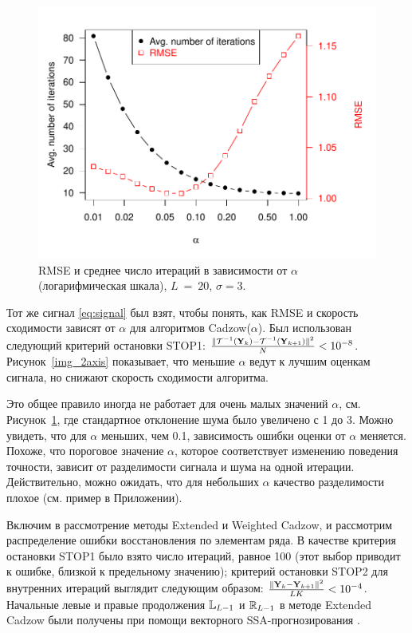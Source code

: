 \documentclass[12pt, specialist, subf,href,colorlinks=true,substylefile = spbu.rtx]{disser}
\theoremstyle{remark}
\theoremstyle{definition}
\begin{document}
\begin{figure}[!hhh]
	\begin{center}
	\includegraphics[width = 0.75\columnwidth]{2axis-3.pdf}
	\caption{RMSE и среднее число итераций в зависимости от $\alpha$ (логарифмическая шкала), $L~=~20$, $\sigma=3$.}
	\label{img_2axis-3}
	\end{center}
\end{figure}

Тот же сигнал \eqref{eq:signal} был взят, чтобы понять, как RMSE и скорость сходимости зависят от $\alpha$ для алгоритмов Cadzow($\alpha$). Был использован следующий критерий остановки STOP1: $\frac{\|\mathcal{T}^{-1}(\mathbf{Y}_k) - \mathcal{T}^{-1}(\mathbf{Y}_{k + 1})\|^2}{N} < 10^{-8}$. Рисунок~\ref{img_2axis} показывает, что меньшие $\alpha$ ведут к лучшим оценкам сигнала, но снижают скорость сходимости алгоритма.

Это общее правило иногда не работает для очень малых значений $\alpha$, см. Рисунок~\ref{img_2axis-3}, где стандартное отклонение шума было увеличено с 1 до 3. Можно увидеть, что для $\alpha$ меньших, чем 0.1, зависимость ошибки оценки от $\alpha$ меняется.
Похоже, что пороговое значение $\alpha$, которое соответствует изменению поведения точности, зависит от разделимости сигнала и шума на одной итерации.
Действительно, можно ожидать,  что для небольших $\alpha$ качество разделимости плохое (см. пример в Приложении).

\smallskip
Включим в рассмотрение методы Extended и Weighted Cadzow, и рассмотрим распределение ошибки восстановления по элементам ряда. В качестве критерия остановки STOP1 было взято число итераций, равное 100 (этот выбор приводит к ошибке, близкой к предельному значению); критерий остановки STOP2 для внутренних итераций выглядит следующим образом:
$\frac{\|\mathbf{Y}_k - \mathbf{Y}_{k+1}\|^2}{LK} < 10^{-4}$. Начальные левые и правые продолжения $\mathbb{L}_{L-1}$ и $\mathbb{R}_{L-1}$ в методе Extended Cadzow были получены при помощи векторного SSA-прогнозирования \cite[глава 2.3.1]{Golyandina.etal2001}.
\end{document}
